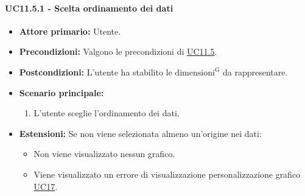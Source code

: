 \paragraph{UC11.5.1 - Scelta ordinamento dei dati}
\label{sec:UC11.5.1}
    \begin{itemize}
        \item \textbf{Attore primario:} Utente.
        \item \textbf{Precondizioni:} Valgono le precondizioni di \hyperref[sec:UC11.5]{UC11.5}.
	    \item \textbf{Postcondizioni:} L'utente ha stabilito le ${\mathrm{dimensioni^{G}}}$ da rappresentare.
	    \item \textbf{Scenario principale:}
	    \begin{enumerate}
	    		\item L'utente sceglie l'ordinamento dei dati.
		\end{enumerate}
		\item \textbf{Estensioni:} Se non viene selezionata almeno un'origine nei dati:
              \begin{itemize}
                  \item Non viene visualizzato nessun grafico.
                  \item Viene visualizzato un errore di visualizzazione personalizzazione grafico \hyperref[sec:UC17 - Errore di personalizzazione]{UC17}.
              \end{itemize}
    \end{itemize}


\newpage

